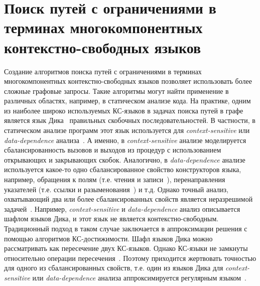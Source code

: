 \chapter{Поиск путей с ограничениями в терминах многокомпонентных контекстно-свободных языков}



Создание алгоритмов поиска путей с ограничениями в терминах многокомпонентных контекстно-свободных языков позволяет использовать более сложные графовые запросы. Такие алгоритмы могут найти применение в различных областях, например, в статическом анализе кода. На практике, одним из наиболее широко используемых КС-языков в задачах поиска путей в графе является язык Дика~\cite{zhang2013fast,kodumal2004set} правильных скобочных последовательностей. В частности, в статическом анализе программ этот язык используется для \textit{context-sensitive} или \textit{data-dependence} анализа~\cite{reps2000undecidability}. А именно,  в \textit{context-sensitive} анализе моделируется сбалансированность вызовов и выходов из процедур с использованием открывающих и закрывающих скобок. Аналогично, в \textit{data-dependence} анализе используется какое-то одно сбалансированное свойство конструкторов языка, например, обращения к полям (т.е. чтения и записи~\cite{bastani2015specification,yan2011demand}), перенаправления указателей (т.е. ссылки и разыменования~\cite{zheng2008demand}) и т.д. Однако точный анализ, охватывающий два или более сбалансированных свойств является неразрешимой задачей~\cite{reps2000undecidability}. Например,  \textit{context-sensitive} и \textit{data-dependence} анализ описывается шафлом языков Дика, и этот язык не является контекстно-свободным. Традиционный подход в таком случае заключается в аппроксимации решения с помощью алгоритмов КС-достижимости. Шафл языков Дика можно рассматривать как пересечение двух КС-языков. Однако КС-языки не замкнуты относительно операции пересечения~\cite{Hopcroft+Ullman/79/Introduction}. Поэтому приходится жертвовать точностью для одного из сбалансированных свойств, т.е. один из языков Дика для \textit{context-sensitive} или \textit{data-dependence} анализа аппроксимируется регулярным языком~\cite{huang2015scalable,sridharan2006refinement}.

